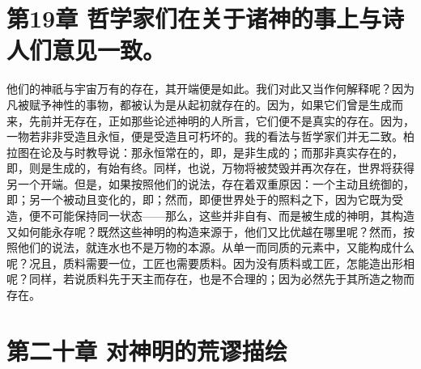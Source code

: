 \par


\section{第19章 哲学家们在关于诸神的事上与诗人们意见一致。}

他们的神祇与宇宙万有的存在，其开端便是如此。我们对此又当作何解释呢？因为凡被赋予神性的事物，都被认为是从起初就存在的。因为，如果它们曾是生成而来，先前并无存在，正如那些论述神明的人所言，它们便不是真实的存在。因为，一物若非非受造且永恒，便是受造且可朽坏的。我的看法与哲学家们并无二致。柏拉图在论及与时教导说：那永恒常在的，即，是非生成的；而那非真实存在的，即，则是生成的，有始有终。同样，也说，万物将被焚毁并再次存在，世界将获得另一个开端。但是，如果按照他们的说法，存在着双重原因：一个主动且统御的，即；另一个被动且变化的，即；然而，即便世界处于的照料之下，因为它既为受造，便不可能保持同一状态——那么，这些并非自有、而是被生成的神明，其构造又如何能永存呢？既然这些神明的构造来源于，他们又比优越在哪里呢？然而，按照他们的说法，就连水也不是万物的本源。从单一而同质的元素中，又能构成什么呢？况且，质料需要一位，工匠也需要质料。因为没有质料或工匠，怎能造出形相呢？同样，若说质料先于天主而存在，也是不合理的；因为必然先于其所造之物而存在。\par


\section{第二十章 对神明的荒谬描绘}


